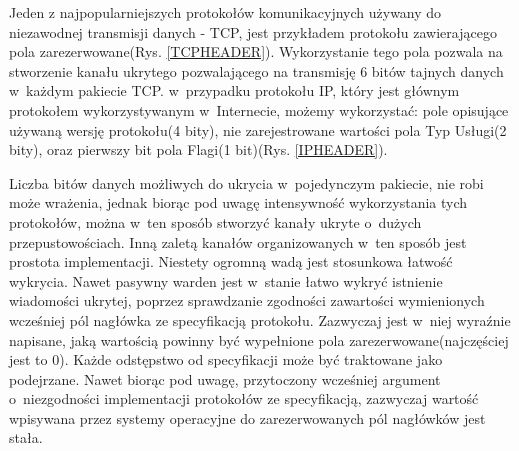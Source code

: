 \documentclass[a4paper, twoside, 12pt]{report}
\begin{document}
        Jeden z najpopularniejszych protokołów komunikacyjnych używany do niezawodnej
        transmisji danych - TCP, jest przykładem protokołu zawierającego pola zarezerwowane(Rys. \ref{TCPHEADER}).
        Wykorzystanie tego pola pozwala na stworzenie kanału ukrytego pozwalającego
        na transmisję 6 bitów tajnych danych w~każdym pakiecie TCP. w~przypadku protokołu
        IP, który jest głównym protokołem wykorzystywanym w~Internecie, możemy wykorzystać: pole
        opisujące używaną wersję protokołu(4 bity), nie zarejestrowane wartości pola Typ Usługi(2 bity),
        oraz pierwszy bit pola Flagi(1 bit)(Rys. \ref{IPHEADER})\cite{IPRFC}.

        Liczba bitów danych
        możliwych do ukrycia w~pojedynczym pakiecie, nie robi może wrażenia, jednak biorąc
        pod uwagę intensywność wykorzystania tych protokołów, można w~ten sposób
        stworzyć kanały ukryte o~dużych przepustowościach. Inną zaletą kanałów organizowanych
        w~ten sposób jest prostota implementacji. Niestety ogromną wadą jest stosunkowa
        łatwość wykrycia. Nawet pasywny warden jest w~stanie łatwo wykryć istnienie wiadomości
        ukrytej, poprzez sprawdzanie zgodności zawartości wymienionych wcześniej pól
        nagłówka ze specyfikacją protokołu. Zazwyczaj jest w~niej wyraźnie napisane,
        jaką wartością powinny być wypełnione pola zarezerwowane(najczęściej jest to 0).
        Każde odstępstwo od specyfikacji może być traktowane jako podejrzane. Nawet biorąc
        pod uwagę, przytoczony wcześniej argument o~niezgodności implementacji protokołów
        ze specyfikacją, zazwyczaj wartość wpisywana przez systemy operacyjne do
        zarezerwowanych pól nagłówków jest stała.
\end{document}
